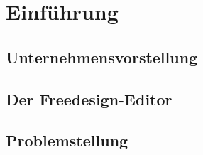 \chapter{Einführung}
\section{Unternehmensvorstellung}

\section{Der Freedesign-Editor}

\section{Problemstellung}
